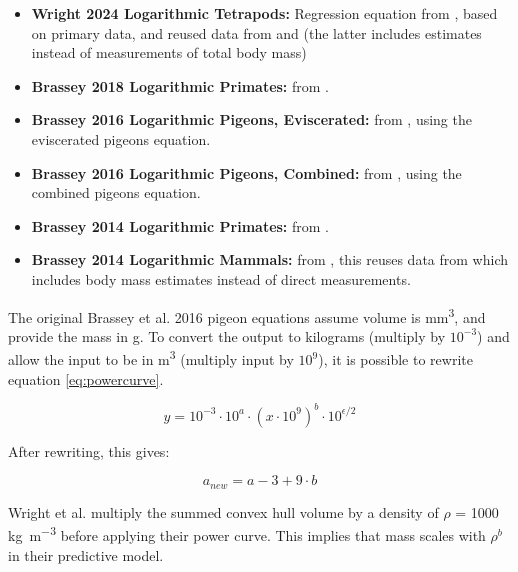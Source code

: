 \documentclass{article}
\begin{document}
\begin{itemize}
    \item \textbf{Wright 2024 Logarithmic Tetrapods:} Regression equation from \cite{wrightVolumetricElementscalingMass2024}, based on primary data, and reused data from \cite{coathamConvexHullEstimation2021} and \cite{sellersMinimumConvexHull2012a} (the latter includes estimates instead of measurements of total body mass)
    \item \textbf{Brassey 2018 Logarithmic Primates:} from \cite{brasseyVolumetricTechniqueFossil2018}.
    \item \textbf{Brassey 2016 Logarithmic Pigeons, Eviscerated:} from \cite{brasseyConvexhullMassEstimates2016}, using the eviscerated pigeons equation.
    \item \textbf{Brassey 2016 Logarithmic Pigeons, Combined:} from \cite{brasseyConvexhullMassEstimates2016}, using the combined pigeons equation.
    \item \textbf{Brassey 2014 Logarithmic Primates:} from \cite{brasseyScalingConvexHull2014}.
    \item \textbf{Brassey 2014 Logarithmic Mammals:} from \cite{brasseyScalingConvexHull2014}, this reuses data from \cite{sellersMinimumConvexHull2012a} which includes body mass estimates instead of direct measurements.
\end{itemize}

The original Brassey et al. 2016 \cite{brasseyConvexhullMassEstimates2016} pigeon equations assume volume is  \si{mm^3}, and provide the mass in \si{g}. To convert the output to kilograms (multiply by \(10^{-3}\)) and allow the input to be in \si{m^3} (multiply input by \(10^9\)), it is possible to rewrite equation \ref{eq:powercurve}.

\begin{equation}
y = 10^{-3} \cdot 10^a \cdot (x \cdot 10^9 )^{b} \cdot 10^{\epsilon /2}
\end{equation}

After rewriting, this gives:

\begin{equation}
    a_{new} = a - 3 + 9\cdot b
\end{equation}

Wright et al. \cite{wrightVolumetricElementscalingMass2024} multiply the summed convex hull volume by a density of \(\rho\) = 1000 \si{kg m^{-3}} before applying their power curve. This implies that mass scales with \(\rho^b\) in their predictive model.
\end{document}
